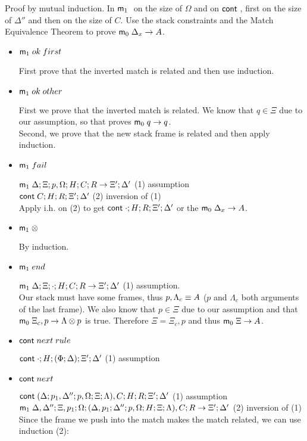 Proof by mutual induction. In $\mathsf{m}_1 \;$ on the size of $\Omega$ and on $\mathsf{cont} \;$, first on the size of $\Delta''$ and then on the size of $C$. Use the stack constraints and the Match Equivalence Theorem to prove $\mathsf{m}_0 \; \Delta_x \rightarrow A$.

\begin{itemize}
   \item $\mathsf{m}_1 \; ok \; first$
   
   First prove that the inverted match is related and then use induction.
   
   \item $\mathsf{m}_1 \; ok \; other$
   
   First we prove that the inverted match is related. We know that $q \in \Xi$ due to our assumption, so that proves $\mathsf{m}_0 \; q \rightarrow q$. \\
   Second, we prove that the new stack frame is related and then apply induction.
   
   \item $\mathsf{m}_1 \; fail$
   
   $\mathsf{m}_1 \; \Delta; \Xi; p, \Omega; H; C; R \rightarrow \Xi'; \Delta'$ \hfill (1) assumption \\
   $\mathsf{cont} \; C; H; R; \Xi'; \Delta'$ \hfill (2) inversion of (1) \\
   Apply i.h. on (2) to get $\mathsf{cont} \; \cdot; H; R; \Xi'; \Delta'$ or the $\mathsf{m}_0 \; \Delta_x \rightarrow A$.
   
   \item $\mathsf{m}_1 \; \otimes$
   
   By induction.
   
   \item $\mathsf{m}_1 \; end$
   
   $\mathsf{m}_1 \; \Delta; \Xi; \cdot; H; C; R \rightarrow \Xi'; \Delta'$ \hfill (1) assumption.\\
   Our stack must have some frames, thus $p, \Lambda_c \equiv A$ ($p$ and $\Lambda_c$ both arguments of the last frame). We also know that $p \in \Xi$ due to our assumption and that $\mathsf{m}_0 \; \Xi_c, p \rightarrow \Lambda \otimes p$ is true. Therefore $\Xi = \Xi_c, p$ and thus $\mathsf{m}_0 \; \Xi \rightarrow A$.
   
   \item $\mathsf{cont} \; next \; rule$
   
   $\mathsf{cont} \; \cdot; H; (\Phi; \Delta); \Xi'; \Delta'$ \hfill (1) assumption \\
   
   \item $\mathsf{cont} \; next$
   
   $\mathsf{cont} \; (\Delta; p_1, \Delta''; p, \Omega; \Xi; \Lambda), C; H; R; \Xi'; \Delta'$ \hfill (1) assumption \\
   $\mathsf{m}_1 \; \Delta, \Delta''; \Xi, p_1;  \Omega; (\Delta, p_1; \Delta''; p, \Omega; H; \Xi; \Lambda), C; R \rightarrow \Xi'; \Delta'$ \hfill (2) inversion of (1)\\
   Since the frame we push into the match makes the match related, we can use induction (2):
   

\end{itemize}
